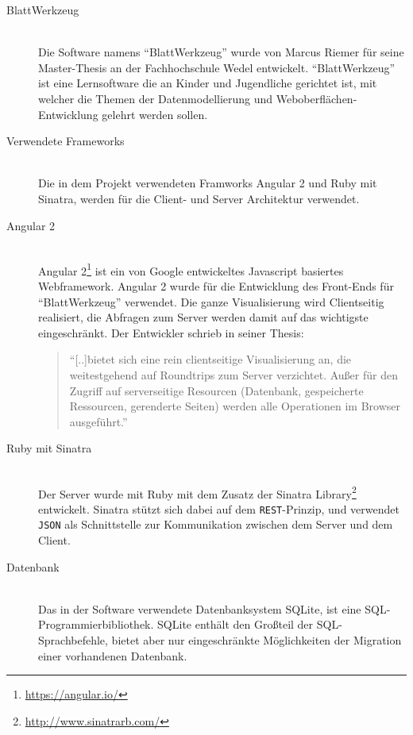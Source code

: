 \begin{description}
\item[BlattWerkzeug] \hfill\\
Die Software namens ``BlattWerkzeug'' wurde von Marcus Riemer für seine Master-Thesis an der Fachhochschule Wedel entwickelt. ``BlattWerkzeug'' ist eine Lernsoftware die an Kinder und Jugendliche gerichtet ist, mit welcher die Themen der Datenmodellierung und Weboberflächen-Entwicklung gelehrt werden sollen.

\item[Verwendete Frameworks] \hfill\\
Die in dem Projekt verwendeten Framworks Angular 2 und Ruby mit Sinatra, werden für die Client- und Server Architektur verwendet.

\item[Angular 2] \hfill\\
Angular 2\footnote{\url{https://angular.io/}}  ist ein von Google entwickeltes Javascript basiertes Webframework. Angular 2 wurde für die Entwicklung des Front-Ends für ``BlattWerkzeug'' verwendet. Die ganze Visualisierung wird Clientseitig realisiert, die Abfragen zum Server werden damit auf das wichtigste eingeschränkt. Der Entwickler schrieb in seiner Thesis: 
\begin{quote}
``[..]bietet sich eine rein clientseitige Visualisierung an, die weitestgehend auf Roundtrips zum Server verzichtet. Außer für den Zugriff auf serverseitige Resourcen (Datenbank, gespeicherte Ressourcen, gerenderte Seiten) werden alle Operationen im Browser ausgeführt.''~\cite{mastersthesis_mri}
\end{quote} 

\item[Ruby mit Sinatra] \hfill\\
Der Server wurde mit Ruby mit dem Zusatz der Sinatra Library\footnote{\url{http://www.sinatrarb.com/}} entwickelt. Sinatra stützt sich dabei auf dem \texttt{REST}-Prinzip, und verwendet \texttt{JSON} als Schnittstelle zur Kommunikation zwischen dem Server und dem Client.

\item[Datenbank] \hfill\\
Das in der Software verwendete Datenbanksystem SQLite, ist eine SQL-Program\-mier\-bibliothek. SQLite enthält den Großteil der SQL-Sprachbefehle, bietet aber nur eingeschränkte Möglichkeiten der Migration einer vorhandenen Datenbank.

\end{description}


